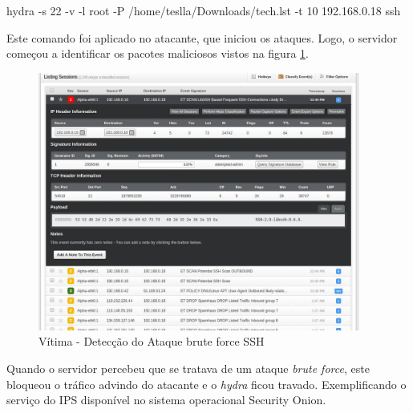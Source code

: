 	\begin{framed}
		hydra -s 22 -v -l root -P /home/teslla/Downloads/tech.lst -t 10 192.168.0.18 ssh
	\end{framed}

	Este comando foi aplicado no atacante, que iniciou os ataques. Logo, o servidor
	começou a identificar os pacotes maliciosos vistos na figura \ref{fig:ssh_vitima}.

	\begin{figure}[h]
		\centering
		\includegraphics[width=400px, scale=1]{resource/ssh_vitima}
		\caption{Vítima - Detecção do Ataque brute force SSH}
		\label{fig:ssh_vitima}
	\end{figure}
	\newpage
 	Quando o servidor percebeu que se tratava de um ataque \emph{brute force}, este bloqueou
	o tráfico advindo do atacante e o \emph{hydra} ficou travado. Exemplificando o serviço
	do IPS disponível no sistema operacional Security Onion.
